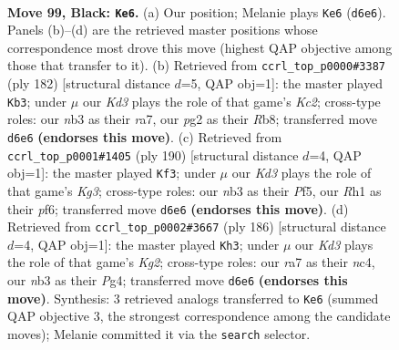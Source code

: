 \documentclass[11pt]{article}
\begin{document}
\clearpage

\begin{figure}[p]\centering
\begin{subfigure}{0.46\textwidth}\centering
\resizebox{\linewidth}{!}{%
\newchessgame
\chessboard[
  setfen={8/R7/3k4/8/5K2/1N6/6P1/7r b - - 63 99},
  showmover=false,
  pgfstyle=straightmove, color=movearrow, markmove={d6-e6}
]}
\caption{}
\end{subfigure}\hfill
\begin{subfigure}{0.46\textwidth}\centering
\resizebox{\linewidth}{!}{%
\newchessgame
\chessboard[
  setfen={1R6/r7/3r4/8/7R/8/2K3k1/8 w - - 18 92},
  showmover=false,
  pgfstyle=straightmove, color=movearrow, markmove={c2-b3}
]}
\caption{}
\end{subfigure}
\\[4pt]
\begin{subfigure}{0.46\textwidth}\centering
\resizebox{\linewidth}{!}{%
\newchessgame
\chessboard[
  setfen={8/R7/5p1k/5P2/1r6/6K1/8/8 w - - 4 96},
  showmover=false,
  pgfstyle=straightmove, color=movearrow, markmove={g3-f3}
]}
\caption{}
\end{subfigure}\hfill
\begin{subfigure}{0.46\textwidth}\centering
\resizebox{\linewidth}{!}{%
\newchessgame
\chessboard[
  setfen={R7/8/4k3/6p1/2n3P1/8/6K1/8 w - - 45 94},
  showmover=false,
  pgfstyle=straightmove, color=movearrow, markmove={g2-h3}
]}
\caption{}
\end{subfigure}
\caption{\textbf{Move 99, Black: \texttt{Ke6}.} (a) Our position; Melanie plays \texttt{Ke6} (\texttt{d6e6}). Panels (b)--(d) are the retrieved master positions whose correspondence most drove this move (highest QAP objective among those that transfer to it). (b) Retrieved from \texttt{ccrl\_top\_p0000\#3387} (ply 182) [structural distance $d$=5, QAP obj=1]: the master played \texttt{Kb3}; under $\mu$ our \emph{Kd3} plays the role of that game's \emph{Kc2}; cross-type roles: our \emph{n}b3 as their \emph{r}a7, our \emph{p}g2 as their \emph{R}b8; transferred move \texttt{d6e6} \textbf{(endorses this move)}. (c) Retrieved from \texttt{ccrl\_top\_p0001\#1405} (ply 190) [structural distance $d$=4, QAP obj=1]: the master played \texttt{Kf3}; under $\mu$ our \emph{Kd3} plays the role of that game's \emph{Kg3}; cross-type roles: our \emph{n}b3 as their \emph{P}f5, our \emph{R}h1 as their \emph{p}f6; transferred move \texttt{d6e6} \textbf{(endorses this move)}. (d) Retrieved from \texttt{ccrl\_top\_p0002\#3667} (ply 186) [structural distance $d$=4, QAP obj=1]: the master played \texttt{Kh3}; under $\mu$ our \emph{Kd3} plays the role of that game's \emph{Kg2}; cross-type roles: our \emph{r}a7 as their \emph{n}c4, our \emph{n}b3 as their \emph{P}g4; transferred move \texttt{d6e6} \textbf{(endorses this move)}. Synthesis: 3 retrieved analogs transferred to \texttt{Ke6} (summed QAP objective 3, the strongest correspondence among the candidate moves); Melanie committed it via the \texttt{search} selector.}
\label{fig:thought-m197}
\end{figure}
\end{document}
